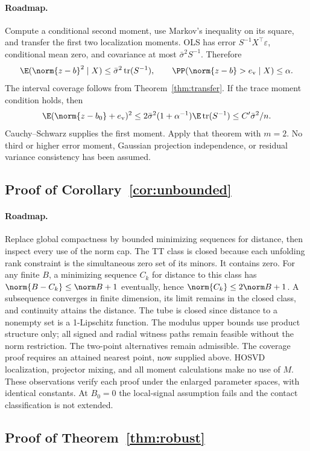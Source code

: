 \paragraph{Roadmap.} Compute a conditional second moment, use Markov's inequality on its square, and transfer the first two localization moments.
OLS has error $S^{-1}X^\top\varepsilon$, conditional mean zero, and covariance at most $\bar\sigma^2S^{-1}$. Therefore
\[
 \E(\norm{z-b}^2\mid X)\le\bar\sigma^2\operatorname{tr}(S^{-1}),
 \qquad
 \PP(\norm{z-b}>e_{\rm v}\mid X)\le\alpha.
\]
The interval coverage follows from Theorem~\ref{thm:transfer}. If the trace moment condition holds, then
\[
 \E(\norm{z-b_0}+e_{\rm v})^2
 \le2\bar\sigma^2(1+\alpha^{-1})\E\operatorname{tr}(S^{-1})
 \le C'\bar\sigma^2/n.
\]
Cauchy--Schwarz supplies the first moment. Apply that theorem with $m=2$. No third or higher error moment, Gaussian projection independence, or residual variance consistency has been assumed.

\subsection{Proof of Corollary~\ref{cor:unbounded}}
\paragraph{Roadmap.} Replace global compactness by bounded minimizing sequences for distance, then inspect every use of the norm cap.
The TT class is closed because each unfolding rank constraint is the simultaneous zero set of its minors. It contains zero. For any finite $B$, a minimizing sequence $C_k$ for distance to this class has $\norm{B-C_k}\le\norm B+1$ eventually, hence $\norm{C_k}\le2\norm B+1$. A subsequence converges in finite dimension, its limit remains in the closed class, and continuity attains the distance. The tube is closed since distance to a nonempty set is a 1-Lipschitz function.
The modulus upper bounds use product structure only; all signed and radial witness paths remain feasible without the norm restriction. The two-point alternatives remain admissible. The coverage proof requires an attained nearest point, now supplied above. HOSVD localization, projector mixing, and all moment calculations make no use of $M$. These observations verify each proof under the enlarged parameter spaces, with identical constants. At $B_0=0$ the local-signal assumption fails and the contact classification is not extended.

\subsection{Proof of Theorem~\ref{thm:robust}}
